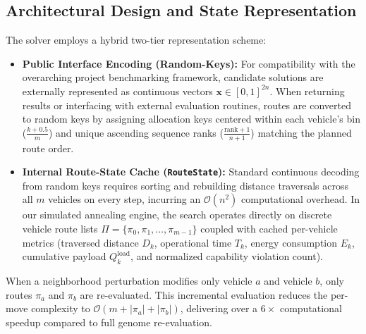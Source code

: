 \subsection{Architectural Design and State Representation}
The solver employs a hybrid two-tier representation scheme:
\begin{itemize}
    \item \textbf{Public Interface Encoding (Random-Keys):} For compatibility with the overarching project benchmarking framework, candidate solutions are externally represented as continuous vectors $\mathbf{x} \in [0, 1]^{2n}$. When returning results or interfacing with external evaluation routines, routes are converted to random keys by assigning allocation keys centered within each vehicle's bin ($\frac{k + 0.5}{m}$) and unique ascending sequence ranks ($\frac{\text{rank} + 1}{n + 1}$) matching the planned route order.
    \item \textbf{Internal Route-State Cache (\texttt{RouteState}):} Standard continuous decoding from random keys requires sorting and rebuilding distance traversals across all $m$ vehicles on every step, incurring an $\mathcal{O}(n^2)$ computational overhead. In our simulated annealing engine, the search operates directly on discrete vehicle route lists $\Pi = \{\pi_0, \pi_1, \dots, \pi_{m-1}\}$ coupled with cached per-vehicle metrics (traversed distance $D_k$, operational time $T_k$, energy consumption $E_k$, cumulative payload $Q_k^{\text{load}}$, and normalized capability violation count). 
\end{itemize}
When a neighborhood perturbation modifies only vehicle $a$ and vehicle $b$, only routes $\pi_a$ and $\pi_b$ are re-evaluated. This incremental evaluation reduces the per-move complexity to $\mathcal{O}(m + |\pi_a| + |\pi_b|)$, delivering over a $6\times$ computational speedup compared to full genome re-evaluation.

